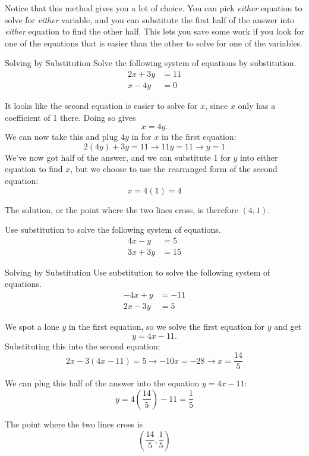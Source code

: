 Notice that this method gives you a lot of choice.  You can pick \emph{either} equation to solve for \emph{either} variable, and you can substitute the first half of the answer into \emph{either} equation to find the other half.  This lets you save some work if you look for one of the equations that is easier than the other to solve for one of the variables.
\pagebreak

\begin{example}[https://www.youtube.com/watch?v=ggZkBtnvLn0]{Solving by Substitution}
Solve the following system of equations by substitution.
\begin{align*}
2x+3y &= 11\\
x-4y &= 0
\end{align*}

\sol
It looks like the second equation is easier to solve for $x$, since $x$ only has a coefficient of 1 there.  Doing so gives \[x=4y.\]
We can now take this and plug $4y$ in for $x$ in the first equation:
\[2(4y)+3y=11 \longrightarrow 11y=11 \longrightarrow y=1\]
We've now got half of the answer, and we can substitute 1 for $y$ into either equation to find $x$, but we choose to use the rearranged form of the second equation:
\[x=4(1) = 4\]

The solution, or the point where the two lines cross, is therefore $\boxed{(4,1)}$.
\end{example}

\begin{try}
Use substitution to solve the following system of equations.
\begin{align*}
4x-y &= 5\\
3x+3y &= 15
\end{align*}
\end{try}

\begin{example}[https://www.youtube.com/watch?v=HqyePXNyhRU]{Solving by Substitution}
Use substitution to solve the following system of equations.
\begin{align*}
-4x+y &= -11\\
2x-3y &= 5
\end{align*}

\sol
We spot a lone $y$ in the first equation, so we solve the first equation for $y$ and get \[y=4x-11.\]
Substituting this into the second equation:
\[2x-3(4x-11)=5 \longrightarrow -10x=-28 \longrightarrow x=\frac{14}{5}\]

We can plug this half of the answer into the equation $y=4x-11$:
\[y=4\left(\frac{14}{5}\right)-11 = \frac{1}{5}\]

The point where the two lines cross is
\[\boxed{\left(\frac{14}{5},\frac{1}{5}\right)}\]
\end{example}

